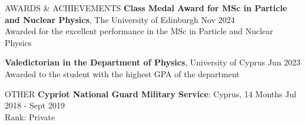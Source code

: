 \documentclass{resume} %
\begin{document}
        \bigbreak

        \begin{rSection}{AWARDS \& ACHIEVEMENTS}
                {\bf Class Medal Award for MSc in Particle and Nuclear Physics}, The University of Edinburgh \hfill Nov 2024\\
                Awarded for the excellent performance in the MSc in Particle and Nuclear Physics

                {\bf Valedictorian in the Department of Physics}, University of Cyprus \hfill Jun 2023\\
                Awarded to the student with the highest GPA of the department
                
                
        \end{rSection} 

        \bigbreak

        \begin{rSection}{OTHER}
                {\bf Cypriot National Guard Military Service}: Cyprus, 14 Months \hfill {Jul 2018 - Sept 2019}\\
                Rank: Private
        \end{rSection}

        \bigbreak

\end{document}
